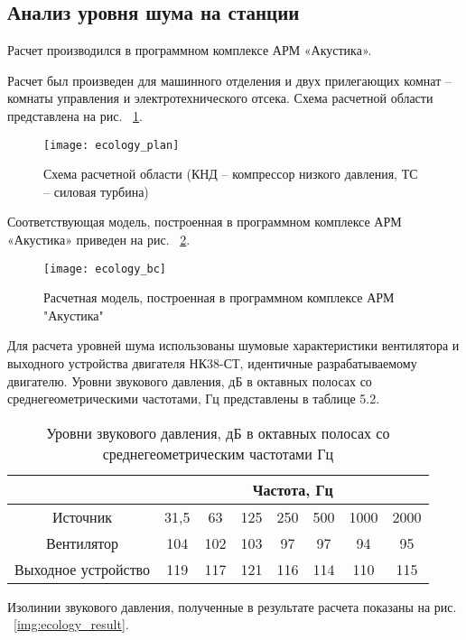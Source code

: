 \subsection{Анализ уровня шума на станции} %
\label{sub:ecology_noise_analisys}

Расчет производился в программном комплексе АРМ «Акустика».

Расчет был произведен для машинного отделения и двух прилегающих комнат – комнаты управления и электротехнического отсека.
Схема расчетной области представлена на рис. ~\ref{img:ecology_plan}.

\begin{figure}[H]
	\centering
	\texttt{[image: ecology\_plan]}
	\caption{Схема расчетной области (КНД – компрессор низкого давления, ТС – силовая турбина)}
	\label{img:ecology_plan}
\end{figure}

Соответствующая модель, построенная в программном комплексе АРМ «Акустика» приведен на рис. ~\ref{img:ecology_bc}.

\begin{figure}[H]
	\centering
	\texttt{[image: ecology\_bc]}
	\caption{Расчетная модель, построенная в программном комплексе АРМ "Акустика"}
	\label{img:ecology_bc}
\end{figure}

Для расчета уровней шума использованы шумовые характеристики вентилятора и выходного устройства двигателя НК38-СТ,
идентичные разрабатываемому двигателю. Уровни звукового давления, дБ в октавных полосах со среднегеометрическими частотами, Гц  представлены в таблице 5.2.

\pagebreak
\begin{samepage}
	\begin{longtable}{|c|c|c|c|c|c|c|c|}
		\caption{Уровни звукового давления, дБ в октавных полосах со среднегеометрическим частотами Гц} \label{tab:ecology_noise_power}
		\hline
		\multicolumn{1}{|c}{}& \multicolumn{7}{c|}{Частота, Гц} \\ \hline
		Источник & 31,5 & 63 & 125 & 250 & 500 & 1000 & 2000 \\ \hline
		Вентилятор & 104 & 102 & 103 & 97 & 97 & 94 & 95 \\ \hline
		Выходное устройство & 119 & 117 & 121 & 116 & 114 & 110 & 115 \\ \hline
		\end{longtable}
\end{samepage}

Изолинии звукового давления, полученные в результате расчета показаны на рис. ~\ref{img:ecology_result}.

